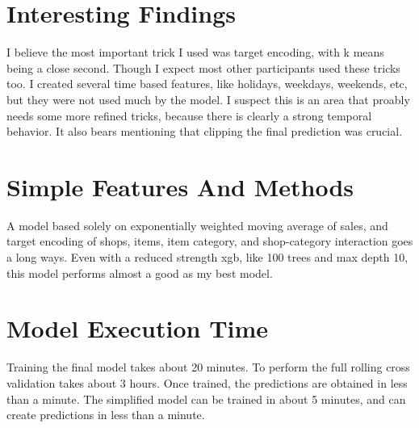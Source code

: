 \documentclass[a4paper]{article}
\begin{document}
\section{Interesting Findings}

I believe the most important trick I used was target encoding, with k means being a close second. Though I expect most other participants used these tricks too. I created several time based features, like holidays, weekdays, weekends, etc, but they were not used much by the model. I suspect this is an area that proably needs some more refined tricks, because there is clearly a strong temporal behavior. It also bears mentioning that clipping the final prediction was crucial.

\section{Simple Features And Methods}

A model based solely on exponentially weighted moving average of sales, and target encoding of shops, items, item category, and shop-category interaction goes a long ways. Even with a reduced strength xgb, like 100 trees and max depth 10, this model performs almost a good as my best model.

\section{Model Execution Time}

Training the final model takes about 20 minutes. To perform the full rolling cross validation takes about 3 hours. Once trained, the predictions are obtained in less than a minute. The simplified model can be trained in about 5 minutes, and can create predictions in less than a minute.
\end{document}
